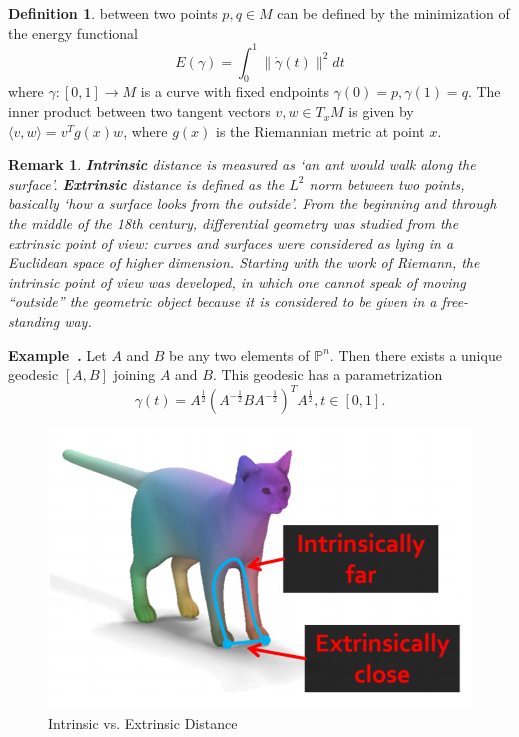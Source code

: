 \documentclass[a4paper]{article}
\theoremstyle{definition}
\newtheorem{definition}{Definition}
\theoremstyle{plain}
\newtheorem{remark}{Remark}
\newenvironment{example}[1][]{\refstepcounter{example}\par\medskip
   \noindent \textbf{Example~\theexample. #1} \rmfamily}{\medskip}
\newcounter{example}{Example}
\begin{document}
\begin{definition}
 between two points $p,q\in M$ can be defined by the minimization of the energy functional
\begin{equation*}
    E(\gamma)=\int^1_0\|\Dot{\gamma}(t)\|^2dt
\end{equation*}
where $\gamma:[0,1]\rightarrow M$ is a curve with fixed endpoints $\gamma(0)=p, \gamma(1)=q$. The inner product between two tangent vectors $v,w\in T_xM$ is given by $\langle v,w\rangle=v^Tg(x)w$, where $g(x)$ is the Riemannian metric at point $x$.
\end{definition}

\begin{remark}\cite{stanford2}
\textbf{Intrinsic} distance is measured as ‘an ant would walk along the surface’. \textbf{Extrinsic} distance is defined as the $L^2$ norm between two points, basically ‘how a surface looks from the outside’. From the beginning and through the middle of the 18th century, differential geometry was studied from the extrinsic point of view: curves and surfaces were considered as lying in a Euclidean space of higher dimension. Starting with the work of Riemann, the intrinsic point of view was developed, in which one cannot speak of moving ``outside'' the geometric object because it is considered to be given in a free-standing way.
\end{remark}

\begin{example}\cite{bhatia}
Let $A$ and $B$ be any two elements of $\mathbb{P}^n$. Then there exists a unique geodesic $[A,B]$ joining $A$ and $B$. This geodesic has a parametrization
\begin{equation*}
    \gamma(t)=A^{\frac{1}{2}}(A^{-\frac{1}{2}}BA^{-\frac{1}{2}})^TA^{\frac{1}{2}}, t\in[0,1].
\end{equation*}
\end{example}

\begin{figure}[H]
   \centering
   \includegraphics[scale=0.4]{figure/intrinsic.png}
   \caption{Intrinsic vs. Extrinsic Distance}
\end{figure}
\end{document}
